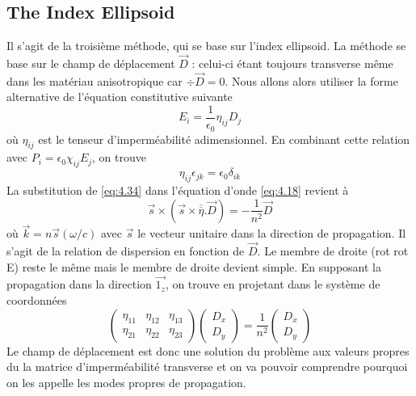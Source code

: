 \subsection{The Index Ellipsoid}
Il s'agit de la troisième méthode, qui se base sur l'index ellipsoid. La méthode se base sur le champ de
déplacement $\vec{D}$ : celui-ci étant toujours transverse même dans les matériau anisotropique car 
$\div\vec{D} =0$. Nous allons alors utiliser la forme alternative de l'équation constitutive suivante
\begin{equation}
E_i = \dfrac{1}{\epsilon_0}\eta_{ij}D_j
\label{eq:4.34}
\end{equation}
où $\eta_{ij}$ est le tenseur d'imperméabilité adimensionnel. En combinant cette relation avec
$P_i = \epsilon_0\chi_{ij}E_j$, on trouve
\begin{equation}
\eta_{ij}\epsilon_{jk} = \epsilon_0\delta_{ik}
\end{equation}
La substitution de \eqref{eq:4.34} dans l'équation d'onde \eqref{eq:4.18} revient à 
\begin{equation}
\vec s\times\left(\vec{s}\times\overline{\overline{\eta}}.\vec{D}\right) = -\dfrac{1}{n^2}\vec{D}
\end{equation}
où $\vec{k}=n\vec{s}(\omega/c)$ avec $\vec{s}$ le vecteur unitaire dans la direction de propagation. 
Il s'agit de la relation de dispersion en fonction de $\vec{D}$. Le membre de droite (rot rot E) reste
le même mais le membre de droite devient simple. En supposant la propagation dans la direction $\vec{1_z}$,
on trouve en projetant dans le système de coordonnées 
\begin{equation}
\left(\begin{array}{ccc}
\eta_{11}&\eta_{12}&\eta_{13}\\
\eta_{21}&\eta_{22}&\eta_{23}
\end{array}\right)\left(\begin{array}{c}
D_x\\
D_y
\end{array}\right) = \dfrac{1}{n^2}\left(\begin{array}{c}
D_x\\
D_y
\end{array}\right)
\end{equation}
Le champ de déplacement est donc une solution du problème aux valeurs propres du la matrice 
d'imperméabilité transverse et on va pouvoir comprendre pourquoi on les appelle les modes propres de 
propagation. \\

